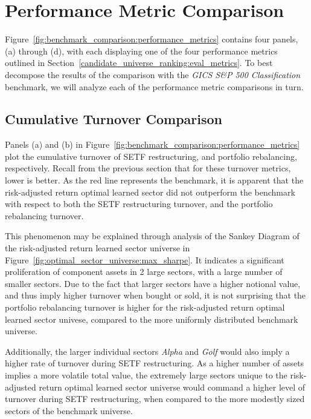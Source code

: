 \documentclass[../main.tex]{subfiles}
\begin{document}
\section{Performance Metric Comparison}

Figure~\ref{fig:benchmark_comparison:performance_metrics} contains four panels, (a) through (d), with each displaying one of the four performance metrics outlined in Section~\ref{candidate_universe_ranking:eval_metrics}. To best decompose the results of the comparison with the \textit{GICS S\&P 500 Classification} benchmark, we will analyze each of the performance metric comparisons in turn.

\subsection{Cumulative Turnover Comparison}

Panels (a) and (b) in Figure~\ref{fig:benchmark_comparison:performance_metrics} plot the cumulative turnover of SETF restructuring, and portfolio rebalancing, respectively. Recall from the previous section that for these turnover metrics, lower is better. As the red line represents the benchmark, it is apparent that the risk-adjusted return optimal learned sector did not outperform the benchmark with respect to both the SETF restructuring turnover, and the portfolio rebalancing turnover.

This phenomenon may be explained through analysis of the Sankey Diagram of the risk-adjusted return learned sector universe in Figure~\ref{fig:optimal_sector_universe:max_sharpe}. It indicates a significant proliferation of component assets in 2 large sectors, with a large number of smaller sectors. Due to the fact that larger sectors have a higher notional value, and thus imply higher turnover when bought or sold, it is not surprising that the portfolio rebalancing turnover is higher for the risk-adjusted return optimal learned sector univese, compared to the more uniformly distributed benchmark universe.

Additionally, the larger individual sectors \textit{Alpha} and \textit{Golf} would also imply a higher rate of turnover during SETF restructuring. As a higher number of assets implies a more volatile total value, the extremely large sectors unique to the risk-adjusted return optimal learned sector universe would command a higher level of turnover during SETF restructuring, when compared to the more modestly sized sectors of the benchmark universe.
\end{document}
